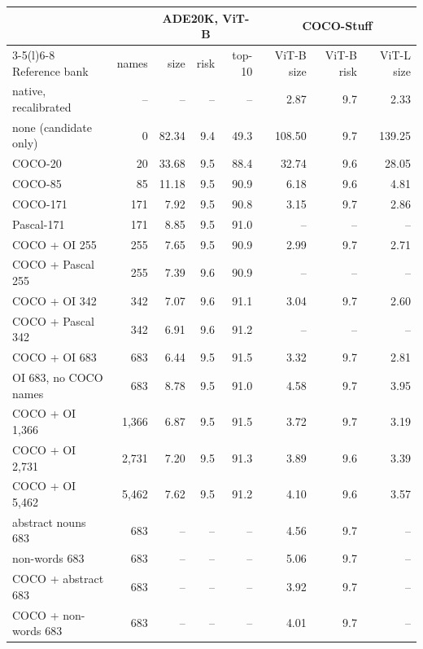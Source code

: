 \begin{tabular}{@{}lrrrrrrr@{}}
\toprule
 & & \multicolumn{3}{c}{ADE20K, ViT-B} & \multicolumn{3}{c}{COCO-Stuff} \\
\cmidrule(lr){3-5}\cmidrule(l){6-8}
Reference bank & names & size & risk & top-10 & ViT-B size & ViT-B risk & ViT-L size \\
\midrule
native, recalibrated & -- & -- & -- & -- & 2.87 & 9.7 & 2.33 \\
\midrule
none (candidate only) & 0 & 82.34 & 9.4 & 49.3 & 108.50 & 9.7 & 139.25 \\
COCO-20 & 20 & 33.68 & 9.5 & 88.4 & 32.74 & 9.6 & 28.05 \\
COCO-85 & 85 & 11.18 & 9.5 & 90.9 & 6.18 & 9.6 & 4.81 \\
COCO-171 & 171 & 7.92 & 9.5 & 90.8 & 3.15 & 9.7 & 2.86 \\
Pascal-171 & 171 & 8.85 & 9.5 & 91.0 & -- & -- & -- \\
COCO + OI 255 & 255 & 7.65 & 9.5 & 90.9 & 2.99 & 9.7 & 2.71 \\
COCO + Pascal 255 & 255 & 7.39 & 9.6 & 90.9 & -- & -- & -- \\
COCO + OI 342 & 342 & 7.07 & 9.6 & 91.1 & 3.04 & 9.7 & 2.60 \\
COCO + Pascal 342 & 342 & 6.91 & 9.6 & 91.2 & -- & -- & -- \\
COCO + OI 683 & 683 & 6.44 & 9.5 & 91.5 & 3.32 & 9.7 & 2.81 \\
OI 683, no COCO names & 683 & 8.78 & 9.5 & 91.0 & 4.58 & 9.7 & 3.95 \\
COCO + OI 1,366 & 1,366 & 6.87 & 9.5 & 91.5 & 3.72 & 9.7 & 3.19 \\
COCO + OI 2,731 & 2,731 & 7.20 & 9.5 & 91.3 & 3.89 & 9.6 & 3.39 \\
COCO + OI 5,462 & 5,462 & 7.62 & 9.5 & 91.2 & 4.10 & 9.6 & 3.57 \\
\midrule
abstract nouns 683 & 683 & -- & -- & -- & 4.56 & 9.7 & -- \\
non-words 683 & 683 & -- & -- & -- & 5.06 & 9.7 & -- \\
COCO + abstract 683 & 683 & -- & -- & -- & 3.92 & 9.7 & -- \\
COCO + non-words 683 & 683 & -- & -- & -- & 4.01 & 9.7 & -- \\
\bottomrule
\end{tabular}
